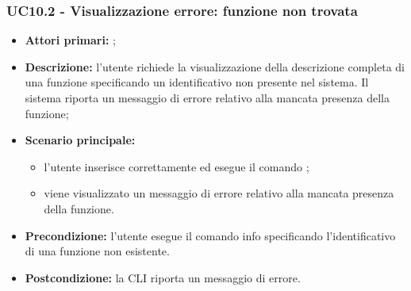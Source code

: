 \subsubsection{UC10.2 - Visualizzazione errore: funzione non trovata}
\begin{itemize}
	\item \textbf{Attori primari:} \ua{};
	\item \textbf{Descrizione:} l’utente richiede la visualizzazione della descrizione completa di una funzione specificando un identificativo non presente nel sistema. Il sistema riporta un messaggio di errore relativo alla mancata presenza della funzione; 
	\item \textbf{Scenario principale:} 
	\begin{itemize}
		\item l'utente inserisce correttamente ed esegue il comando \pinfo{}; 
		\item viene visualizzato un messaggio di errore relativo alla mancata presenza della funzione. 
	\end{itemize}
	\item \textbf{Precondizione:} l’utente esegue il comando info specificando l’identificativo di una funzione non esistente. 
	\item \textbf{Postcondizione:} la CLI riporta un messaggio di errore.
\end{itemize}